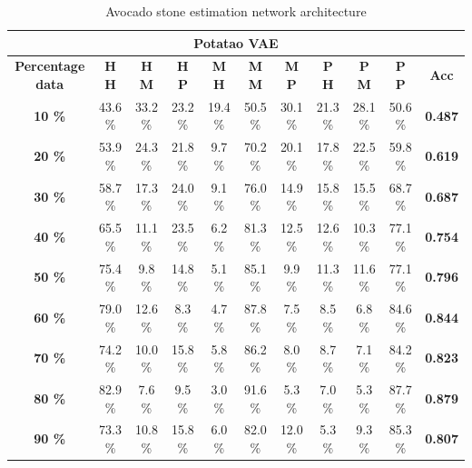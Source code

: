 \documentclass[11pt]{article}
\begin{document}
  \begin{table}[h!]
  \centering
  \begin{adjustbox}{max width=\textwidth}
  \begin{tabular}{*{11}{c}}%
  \hline
  \multicolumn{11}{c}{\textbf{Potatao VAE}}
  \\
 \hline
 \textbf{Percentage data} & \textbf{H H} & \textbf{H M} & \textbf{H P} & \textbf{M H} & \textbf{M M} & \textbf{M P} & \textbf{P H} & \textbf{P M} & \textbf{P P} & \textbf{Acc}\\
 \hline
 \hline
 \textbf{10 \%}  & 43.6 \% & 33.2 \% & 23.2 \% & 19.4 \% & 50.5 \% & 30.1 \% & 21.3 \% & 28.1 \% & 50.6 \% & \textbf{0.487} \\
 \hline
 \textbf{20 \%} & 53.9 \% & 24.3 \% & 21.8 \% & 9.7 \% & 70.2 \% & 20.1 \% & 17.8 \% & 22.5 \% & 59.8 \% & \textbf{0.619} \\
 \hline
 \textbf{30 \%} & 58.7 \% & 17.3 \% & 24.0 \% & 9.1 \% & 76.0 \% & 14.9 \% & 15.8 \% & 15.5 \% & 68.7 \% & \textbf{0.687} \\
 \hline
 \textbf{40 \%} & 65.5 \% & 11.1 \% & 23.5 \% & 6.2 \% & 81.3 \% & 12.5 \% & 12.6 \% & 10.3 \%  & 77.1 \% & \textbf{0.754} \\
 \hline
 \textbf{50 \%} & 75.4 \% & 9.8 \% & 14.8 \% & 5.1 \% & 85.1 \% & 9.9 \% & 11.3 \% & 11.6 \% & 77.1 \% & \textbf{0.796} \\
 \hline
 \textbf{60 \%} & 79.0 \% & 12.6 \% & 8.3 \% & 4.7 \% & 87.8 \% & 7.5 \% & 8.5 \% & 6.8 \% & 84.6 \% & \textbf{0.844} \\
 \hline
 \textbf{70 \%} & 74.2 \% & 10.0 \% & 15.8 \% & 5.8 \% & 86.2 \% & 8.0 \% & 8.7 \% & 7.1 \% & 84.2 \% & \textbf{0.823} \\
 \hline
\textbf{80 \%} & 82.9 \% & 7.6 \% & 9.5 \%  & 3.0 \% & 91.6 \% & 5.3 \% & 7.0 \% & 5.3 \% & 87.7 \% & \textbf{0.879} \\
 \hline
 \textbf{90 \%} & 73.3 \% & 10.8 \% & 15.8 \% & 6.0 \% & 82.0 \% & 12.0 \% & 5.3 \% & 9.3 \% & 85.3 \% & \textbf{0.807} \\
 \hline
\end{tabular}
\end{adjustbox}
  \caption{Avocado stone estimation network architecture}
  \label{tab:experiments_avo_cnn}
\end{table}
\end{document}
